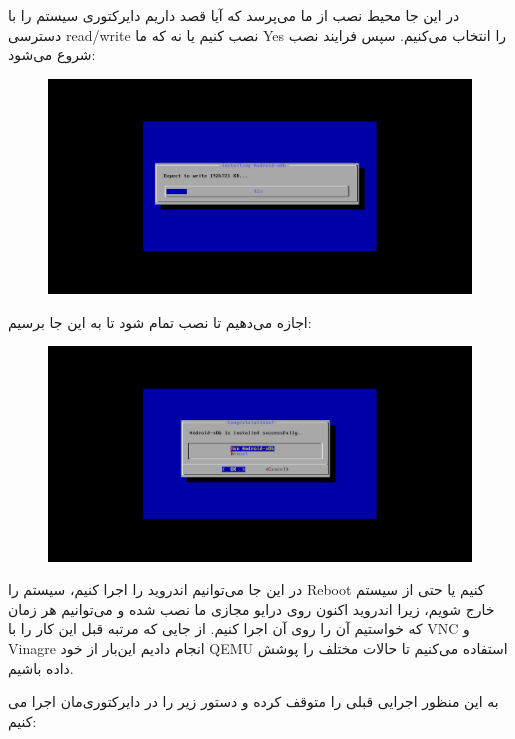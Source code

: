 \documentclass{article}
\begin{document}
در این جا محیط نصب از ما می‌پرسد که آیا قصد داریم دایرکتوری سیستم را با دسترسی read/write نصب کنیم یا نه که ما Yes را انتخاب می‌‌کنیم. سپس فرایند نصب شروع می‌شود:

\begin{figure}[ht]
	\centering	
	\includegraphics[width = 1\textwidth]{images/install14.png}
\end{figure}

اجازه می‌دهیم تا نصب تمام شود تا به این جا برسیم:

\newpage

\begin{figure}[h]
	\centering	
	\includegraphics[width = 1\textwidth]{images/install15.png}
\end{figure}

در این جا می‌توانیم اندروید را اجرا کنیم، سیستم را Reboot کنیم یا حتی از سیستم خارج شویم، زیرا اندروید اکنون روی درایو مجازی ما نصب شده و می‌توانیم هر زمان که خواستیم آن را روی آن اجرا کنیم. از جایی که مرتبه قبل این کار را با VNC و Vinagre انجام دادیم این‌بار از خود QEMU استفاده می‌کنیم تا حالات مختلف را پوشش داده باشیم.

به این منظور اجرایی قبلی را متوقف کرده و دستور زیر را در دایرکتوری‌مان اجرا می کنیم:
\end{document}
